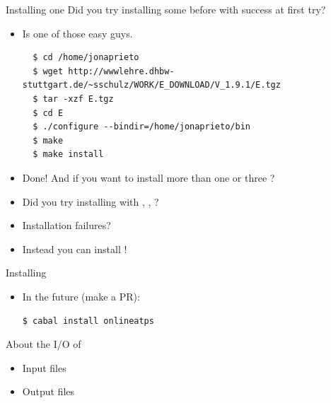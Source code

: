 \documentclass[newPxFont]{beamer}
\begin{document}
\begin{frame}[fragile]{Installing one \atp }
Did you try installing some \atp before with success at first try?\\
\begin{itemize}
\item {} Is one of those easy guys.
  \begin{lstlisting}
  $ cd /home/jonaprieto
  $ wget http://wwwlehre.dhbw-stuttgart.de/~sschulz/WORK/E_DOWNLOAD/V_1.9.1/E.tgz
  $ tar -xzf E.tgz
  $ cd E
  $ ./configure --bindir=/home/jonaprieto/bin
  $ make
  $ make install
  \end{lstlisting}
\end{itemize}
\end{frame}

\begin{frame}
\begin{itemize}
\item Done! And if you want to install more than one or three \atps?\\
\item Did you try installing with \spass, \metis, \vampire?\\
\item Installation failures?
\item Instead you can install \onlineatps!
\end{itemize}
\end{frame}

\begin{frame}[fragile]{Installing \onlineatps}
\begin{itemize} \onlineatps
\begin{lstlisting}
$ git clone https://github.com/jonaprieto/onlineatps
$ cd ~/onlineatps
$ cabal install
\end{lstlisting}
\item In the future (make a PR):
\begin{lstlisting}
$ cabal install onlineatps
\end{lstlisting}
\end{itemize}
\end{frame}

\begin{frame}

About the I/O of \atps
\begin{itemize}
\item Input files
\item Output files
\end{itemize}

\end{frame}
\end{document}
